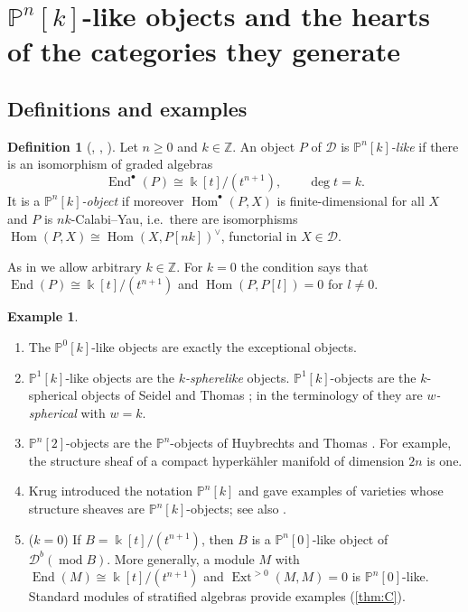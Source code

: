 \documentclass[11pt,reqno]{amsart}
\theoremstyle{plain}
\theoremstyle{definition}
\newtheorem{definition}[theorem]{Definition}
\newtheorem{example}[theorem]{Example}
\theoremstyle{remark}
\newcommand{\kk}{\Bbbk}
\DeclareMathOperator{\Hom}{Hom}
\DeclareMathOperator{\End}{End}
\DeclareMathOperator{\Ext}{Ext}
\newcommand{\modd}{\operatorname{mod}}
\newcommand{\Db}{\mathcal{D}^b}
\newcommand{\Pn}[2]{\mathbb{P}^{#1}[#2]}
\newcommand{\cD}{\mathcal{D}}
\begin{document}
\section{\texorpdfstring{$\mathbb{P}^n[k]$}{Pn[k]}-like objects and the hearts of the categories they generate}\label{sec:P-objects}

\subsection{Definitions and examples}

\begin{definition}[{\cite{Kru18}, \cite[Def.~2.1]{HK19}, \cite[Def.~2.1]{Bonf26}}]\label{def:Pnk}
Let $n\ge0$ and $k\in\mathbb{Z}$. An object $P$ of $\cD$ is \emph{$\Pn nk$-like} if there is an isomorphism of graded algebras
\[\End^\bullet(P)\cong\kk[t]/(t^{n+1}),\qquad\deg t=k.\]
It is a \emph{$\Pn nk$-object} if moreover $\Hom^\bullet(P,X)$ is finite-dimensional for all $X$ and $P$ is $nk$-Calabi--Yau, i.e.\ there are isomorphisms $\Hom(P,X)\cong\Hom(X,P[nk])^\vee$, functorial in $X\in\cD$.
\end{definition}

As in \cite{Bonf26} we allow arbitrary $k\in\mathbb{Z}$. For $k=0$ the condition says that $\End(P)\cong\kk[t]/(t^{n+1})$ and $\Hom(P,P[l])=0$ for $l\ne0$.

\begin{example}\label{ex:Pnk}
\leavevmode
\begin{enumerate}
\item The $\Pn0k$-like objects are exactly the exceptional objects.
\item $\Pn1k$-like objects are the \emph{$k$-spherelike} objects. $\Pn1k$-objects are the $k$-spherical objects of Seidel and Thomas \cite{ST01}; in the terminology of \cite{HJY13} they are \emph{$w$-spherical} with $w=k$.
\item $\Pn n2$-objects are the $\mathbb{P}^n$-objects of Huybrechts and Thomas \cite{HT06}. For example, the structure sheaf of a compact hyperk\"ahler manifold of dimension $2n$ is one.
\item Krug \cite{Kru18} introduced the notation $\Pn nk$ and gave examples of varieties whose structure sheaves are $\Pn nk$-objects; see also \cite{HK19}.
\item ($k=0$) If $B=\kk[t]/(t^{n+1})$, then $B$ is a $\Pn n0$-like object of $\Db(\modd B)$. More generally, a module $M$ with $\End(M)\cong\kk[t]/(t^{n+1})$ and $\Ext^{>0}(M,M)=0$ is $\Pn n0$-like. Standard modules of stratified algebras provide examples (\cref{thm:C}).
\end{enumerate}
\end{example}
\end{document}
